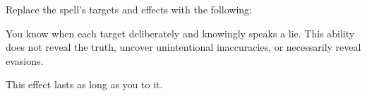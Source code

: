 Replace the spell's targets and effects with the following:
\begin{spellcontent}

\begin{augmenttargetinginfo}




\end{augmenttargetinginfo}


\begin{augmenteffects}



\spelleffect
You know when each target deliberately and knowingly speaks a lie.
This ability does not reveal the truth, uncover unintentional inaccuracies, or necessarily reveal evasions.

This effect lasts as long as you  to it.








\end{augmenteffects}

\end{spellcontent}








